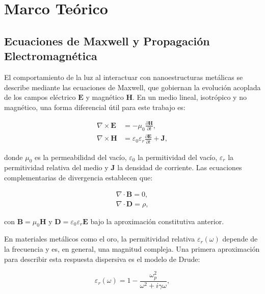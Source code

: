 \section{Marco Teórico}\label{sec:marco_teorico}

\subsection{Ecuaciones de Maxwell y Propagación Electromagnética}\label{subsec:maxwell}

El comportamiento de la luz al interactuar con nanoestructuras metálicas se describe mediante las ecuaciones de Maxwell, que gobiernan la evolución acoplada de los campos eléctrico $\mathbf{E}$ y magnético $\mathbf{H}$. En un medio lineal, isotrópico y no magnético, una forma diferencial útil para este trabajo es:

\begin{align}
    \nabla \times \mathbf{E} &= -\mu_0 \frac{\partial \mathbf{H}}{\partial t}, \label{eq:faraday} \\
    \nabla \times \mathbf{H} &= \varepsilon_0 \varepsilon_r \frac{\partial \mathbf{E}}{\partial t} + \mathbf{J}, \label{eq:ampere}
\end{align}

\noindent donde $\mu_0$ es la permeabilidad del vacío, $\varepsilon_0$ la permitividad del vacío, $\varepsilon_r$ la permitividad relativa del medio y $\mathbf{J}$ la densidad de corriente. Las ecuaciones complementarias de divergencia establecen que:

\begin{align}
    \nabla \cdot \mathbf{B} = 0,  \\
    \nabla \cdot \mathbf{D} = \rho,
\end{align}

\noindent con $\mathbf{B} = \mu_0 \mathbf{H}$ y $\mathbf{D} = \varepsilon_0 \varepsilon_r \mathbf{E}$ bajo la aproximación constitutiva anterior.

En materiales metálicos como el oro, la permitividad relativa $\varepsilon_r(\omega)$ depende de la frecuencia y es, en general, una magnitud compleja. Una primera aproximación para describir esta respuesta dispersiva es el modelo de Drude:

\begin{equation}
\varepsilon_r(\omega) = 1 - \frac{\omega_p^2}{\omega^2 + i\gamma\omega}, \label{eq:drude}
\end{equation}

